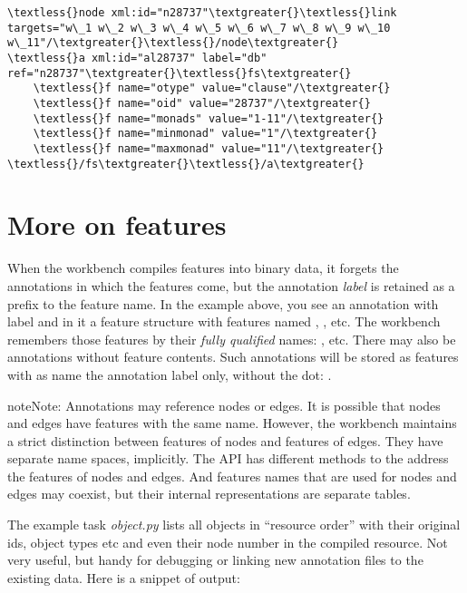 \documentclass[letterpaper,10pt,english]{sphinxmanual}
\begin{document}
\begin{Verbatim}[commandchars=\\\{\}]
\textless{}node xml:id="n28737"\textgreater{}\textless{}link targets="w\_1 w\_2 w\_3 w\_4 w\_5 w\_6 w\_7 w\_8 w\_9 w\_10 w\_11"/\textgreater{}\textless{}/node\textgreater{}
\textless{}a xml:id="al28737" label="db" ref="n28737"\textgreater{}\textless{}fs\textgreater{}
    \textless{}f name="otype" value="clause"/\textgreater{}
    \textless{}f name="oid" value="28737"/\textgreater{}
    \textless{}f name="monads" value="1-11"/\textgreater{}
    \textless{}f name="minmonad" value="1"/\textgreater{}
    \textless{}f name="maxmonad" value="11"/\textgreater{}
\textless{}/fs\textgreater{}\textless{}/a\textgreater{}
\end{Verbatim}


\section{More on features}
\label{taskwriting:more-on-features}
When the workbench compiles features into binary data, it forgets the annotations in which the features come,
but the annotation \emph{label} is retained as a prefix to the feature name.
In the example above, you see an annotation with label  and in it a feature structure
with features named , , etc.
The workbench remembers those features by their \emph{fully qualified} names: ,  etc.
There may also be annotations without feature contents. Such annotations will be stored as features with as name the
annotation label only, without the dot: .

\begin{notice}{note}{Note:}
Annotations may reference nodes or edges.
It is possible that nodes and edges have features with the same name.
However, the workbench maintains a strict distinction between features
of nodes and features of edges. They have separate name spaces, implicitly.
The API has different methods to the address the features of nodes and edges.
And features names that are used for nodes and edges may coexist, but their
internal representations are separate tables.
\end{notice}

The example task \emph{object.py} lists all objects in ``resource order'' with their original ids,
object types etc and even their node number in the compiled resource.
Not very useful, but handy for debugging or linking new annotation files to the existing data.
Here is a snippet of output:
\end{document}
